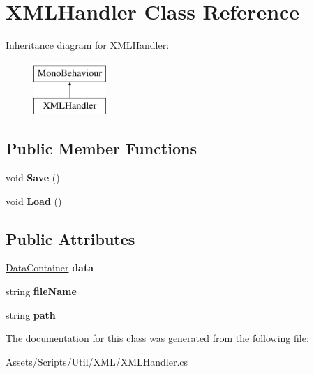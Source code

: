 \hypertarget{class_x_m_l_handler}{}\section{X\+M\+L\+Handler Class Reference}
\label{class_x_m_l_handler}
Inheritance diagram for X\+M\+L\+Handler\+:\begin{figure}[H]
\begin{center}
\leavevmode
\includegraphics[height=2.000000cm]{class_x_m_l_handler}
\end{center}
\end{figure}
\subsection*{Public Member Functions}
\begin{DoxyCompactItemize}
\item 
void {\bfseries Save} ()\hypertarget{class_x_m_l_handler_abdd4335459809038f034592d55451d84}{}\label{class_x_m_l_handler_abdd4335459809038f034592d55451d84}

\item 
void {\bfseries Load} ()\hypertarget{class_x_m_l_handler_a52b84742394d40ebf5865f368571875c}{}\label{class_x_m_l_handler_a52b84742394d40ebf5865f368571875c}

\end{DoxyCompactItemize}
\subsection*{Public Attributes}
\begin{DoxyCompactItemize}
\item 
\hyperlink{class_data_container}{Data\+Container} {\bfseries data}\hypertarget{class_x_m_l_handler_a27ec385b2798c6fdd579ed2b42963cc3}{}\label{class_x_m_l_handler_a27ec385b2798c6fdd579ed2b42963cc3}

\item 
string {\bfseries file\+Name}\hypertarget{class_x_m_l_handler_a39d8547732ef14cf81cca38b83e007d7}{}\label{class_x_m_l_handler_a39d8547732ef14cf81cca38b83e007d7}

\item 
string {\bfseries path}\hypertarget{class_x_m_l_handler_ac47db543ca6835731a3f33f66e20ad38}{}\label{class_x_m_l_handler_ac47db543ca6835731a3f33f66e20ad38}

\end{DoxyCompactItemize}


The documentation for this class was generated from the following file\+:\begin{DoxyCompactItemize}
\item 
Assets/\+Scripts/\+Util/\+X\+M\+L/X\+M\+L\+Handler.\+cs\end{DoxyCompactItemize}
